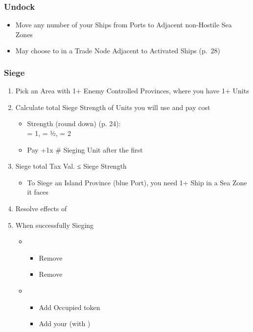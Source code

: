 \documentclass[10pt]{article}
\begin{document}
\subsubsection*{Undock}
\begin{itemize}
	\item Move any number of your Ships from Ports to Adjacent non-Hostile Sea Zones
	\item {}May choose to  in a Trade Node Adjacent to Activated Ships (p.~28)
\end{itemize}

\subsubsection*{Siege }
\begin{enumerate}
	\item Pick an Area with 1+ Enemy Controlled Provinces, where you have 1+ Units
	\item Calculate total Siege Strength of Units you will use and pay \milpower cost
	\begin{itemize}
		\item Strength (round down) (p. 24): \\
		\infantry = 1, \cavalry = ½, \artillery = 2 
		\item Pay +1\milpower x \# Sieging Unit after the first
	\end{itemize}
	\item Siege total Tax Val. ≤ Siege Strength
	\begin{itemize}
		\item To Siege an Island Province (blue Port), you need 1+ Ship in a Sea Zone it faces
	\end{itemize}
	\item Resolve effects of 
	\item When successfully Sieging
	\begin{itemize}
		\item {}
		\begin{itemize}
			\item Remove \rebeltown
			\item Remove \unrest
		\end{itemize}
		\item {}
		\begin{itemize}
			\item Add Occupied token
			\item Add your \town (with \unrest)

\end{itemize}
\end{itemize}
\end{enumerate}
\end{document}
